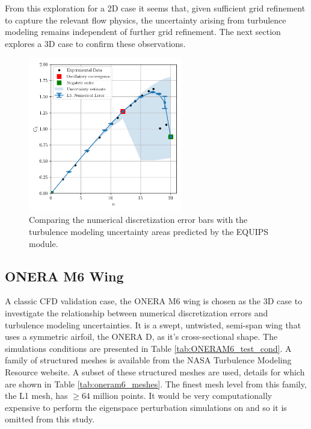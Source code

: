 From this exploration for a 2D case it seems that, given sufficient grid refinement to capture the relevant flow physics, the uncertainty arising from turbulence modeling remains independent of further grid refinement. 
The next section explores a 3D case to confirm these observations. 

\begin{figure}
\center
\includegraphics[width=0.6\textwidth]{code/image_gen/naca0012/images/naca0012_CL_vs_alpha_num_uq_L3.png}
\caption{Comparing the numerical discretization error bars with the turbulence modeling uncertainty areas predicted by the EQUIPS module. \label{fig:naca0012_num+turb_uq}}
\end{figure}

\subsection{ONERA M6 Wing}

A classic CFD validation case, the ONERA M6 wing is chosen as the 3D case to investigate the relationship between numerical discretization errors and turbulence modeling uncertainties. 
It is a swept, untwisted, semi-span wing that uses a symmetric airfoil, the ONERA D, as it's cross-sectional shape. 
The simulations conditions are presented in Table \ref{tab:ONERAM6_test_cond}.
A family of structured meshes is available from the NASA Turbulence Modeling Resource website.
A subset of these structured meshes are used, details for which are shown in Table \ref{tab:oneram6_meshes}.
The finest mesh level from this family, the L1 mesh, has $\ge 64$ million points. 
It would be very computationally expensive to perform the eigenspace perturbation simulations on and so it is omitted from this study.

